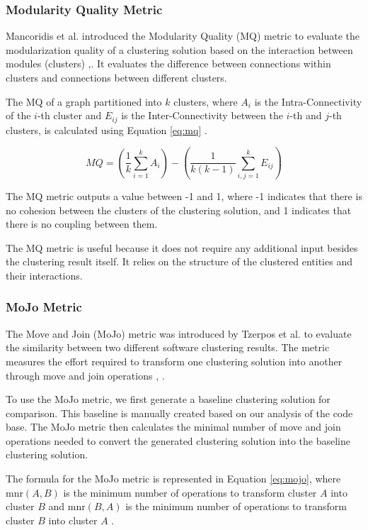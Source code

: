 \documentclass{ieeeaccess}
\begin{document}
\subsubsection{Modularity Quality Metric}

Mancoridis et al. introduced the Modularity Quality (MQ) metric to evaluate the modularization quality of a clustering solution based on the interaction between modules (clusters) \cite{b2},\cite{b10}. It evaluates the difference between connections within clusters and connections between different clusters.

The MQ of a graph partitioned into \( k \) clusters, where \( A_i \) is the Intra-Connectivity of the \( i \)-th cluster and \( E_{ij} \) is the Inter-Connectivity between the \( i \)-th and \( j \)-th clusters, is calculated using Equation \eqref{eq:mq} \cite{b2}.

\begin{equation}
MQ = \left( \frac{1}{k} \sum_{i=1}^{k} A_i \right) - \left( \frac{1}{k(k-1)} \sum_{i,j=1}^{k} E_{ij} \right)
\label{eq:mq}
\end{equation}

The MQ metric outputs a value between -1 and 1, where -1 indicates that there is no cohesion between the clusters of the clustering solution, and 1 indicates that there is no coupling between them.

The MQ metric is useful because it does not require any additional input besides the clustering result itself. It relies on the structure of the clustered entities and their interactions. 

\subsubsection{MoJo Metric}

The Move and Join (MoJo) metric was introduced by Tzerpos et al. to evaluate the similarity between two different software clustering results. The metric measures the effort required to transform one clustering solution into another through move and join operations \cite{b3}, \cite{b11}.

To use the MoJo metric, we first generate a baseline clustering solution for comparison. This baseline is manually created based on our analysis of the code base. The MoJo metric then calculates the minimal number of move and join operations needed to convert the generated clustering solution into the baseline clustering solution.

The formula for the MoJo metric is represented in Equation \eqref{eq:mojo}, where \( \text{mnr}(A, B) \) is the minimum number of operations to transform cluster \( A \) into cluster \( B \) and \( \text{mnr}(B, A) \) is the minimum number of operations to transform cluster \( B \) into cluster \( A \) \cite{b3}. 
\end{document}
